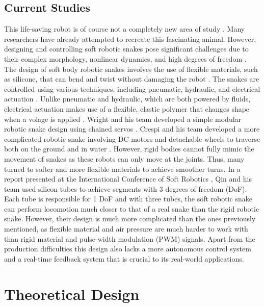 \documentclass[twoside]{article}
\begin{document}
\subsection{Current Studies}
This life-saving robot is of course not a completely new area of study \cite{cycc21}\cite{klt13}\cite{m18}. Many researchers have already attempted to recreate this fascinating animal. However, designing and controlling soft robotic snakes pose significant challenges due to their complex morphology, nonlinear dynamics, and high degrees of freedom \cite{Paap2000ARS}\cite{Matsuno2003ControlOR}\cite{Hirose2004BiologicallyIS}. The design of soft body robotic snakes involves the use of flexible materials, such as silicone, that can bend and twist without damaging the robot \cite{llcl19}. The snakes are controlled using various techniques, including pneumatic, hydraulic, and electrical actuation \cite{llcl19}\cite{lschw21}\cite{Palmre2014NanothornEF}. Unlike pneumatic and hydraulic, which are both powered by fluids, electrical actuation makes use of a flexible, elastic polymer that changes shape when a volage is applied \cite{gbzsp20}\cite{doi:10.2514/6.2001-1492}. Wright and his team developed a simple modular robotic snake design using chained servos \cite{Wright2007DesignOA}. Crespi and his team developed a more complicated robotic snake involving DC motors and detachable wheels to traverse both on the ground and in water \cite{Crespi2006AmphiBotIA}. However, rigid bodies cannot fully mimic the movement of snakes as these robots can only move at the joints. Thus, many turned to softer and more flexible materials to achieve smoother turns\cite{Onal2013AutonomousUS}\cite{Skorina2018ReversePA}. In a report presented at the International Conference of Soft Robotics \cite{qwsslo18}, Qin and his team used silicon tubes to achieve segments with 3 degrees of freedom (DoF). Each tube is responsible for 1 DoF and with three tubes, the soft robotic snake can perform locomotion much closer to that of a real snake than the rigid robotic snake. However, their design is much more complicated than the ones previously mentioned, as flexible material and air pressure are much harder to work with than rigid material and pulse-width modulation (PWM) signals. Apart from the production difficulties this design also lacks a more autonomous control system and a real-time feedback system that is crucial to its real-world applications. 


\section{Theoretical Design}
\end{document}
